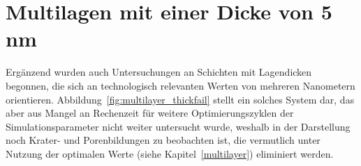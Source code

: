 \section{Multilagen mit einer Dicke von 5 nm}

Ergänzend wurden auch Untersuchungen an Schichten mit Lagendicken begonnen, die sich an technologisch relevanten Werten von mehreren Nanometern orientieren.
Abbildung~\ref{fig:multilayer_thickfail} stellt ein solches System dar, das aber aus Mangel an Rechenzeit für weitere Optimierungszyklen der Simulationsparameter nicht weiter untersucht wurde, weshalb in der Darstellung noch Krater- und Porenbildungen zu beobachten ist, die vermutlich unter Nutzung der optimalen Werte (siehe Kapitel~\ref{multilayer}) eliminiert werden.
